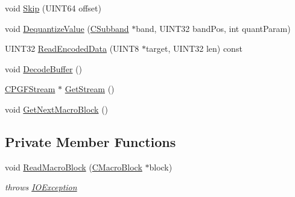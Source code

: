 \begin{DoxyCompactItemize}
void \mbox{\hyperlink{classCDecoder_acc125e94ea5c6af11a91ac1c4a43cf8f}{Skip}} (U\+I\+N\+T64 offset)
\item 
void \mbox{\hyperlink{classCDecoder_acccce19e51f507dedbd564f2ce5c72e7}{Dequantize\+Value}} (\mbox{\hyperlink{classCSubband}{C\+Subband}} $\ast$band, U\+I\+N\+T32 band\+Pos, int quant\+Param)
\item 
U\+I\+N\+T32 \mbox{\hyperlink{classCDecoder_a4146a0adddfe52ca79de8b0be58e8482}{Read\+Encoded\+Data}} (U\+I\+N\+T8 $\ast$target, U\+I\+N\+T32 len) const
\item 
void \mbox{\hyperlink{classCDecoder_a78b5590168027919fcdba0ee9cbe2610}{Decode\+Buffer}} ()
\item 
\mbox{\hyperlink{classCPGFStream}{C\+P\+G\+F\+Stream}} $\ast$ \mbox{\hyperlink{classCDecoder_a49deab3805a603f9332e2a1b6a58d800}{Get\+Stream}} ()
\item 
void \mbox{\hyperlink{classCDecoder_ad152fbdc42a8a47960be7ba00c5fbb85}{Get\+Next\+Macro\+Block}} ()
\end{DoxyCompactItemize}
\subsection*{Private Member Functions}
\begin{DoxyCompactItemize}
\item 
void \mbox{\hyperlink{classCDecoder_a55cbccabab76500fd47e15332d6b6506}{Read\+Macro\+Block}} (\mbox{\hyperlink{classCDecoder_1_1CMacroBlock}{C\+Macro\+Block}} $\ast$block)
\begin{DoxyCompactList}\small\item\em throws \mbox{\hyperlink{structIOException}{I\+O\+Exception}} \end{DoxyCompactList}\end{DoxyCompactItemize}
